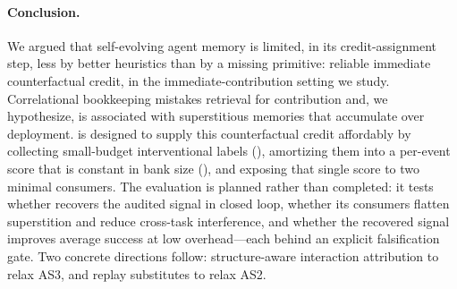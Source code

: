 \paragraph{Conclusion.}
We argued that self-evolving agent memory is limited, in its credit-assignment
step, less by better heuristics than by a missing primitive: reliable immediate
counterfactual credit, in the immediate-contribution setting we study.
Correlational bookkeeping mistakes retrieval for contribution and, we hypothesize,
is associated with superstitious memories that accumulate over deployment.
\method{} is designed to supply this counterfactual credit
affordably by collecting small-budget interventional labels (\rit{}), amortizing
them into a per-event score that is constant in bank size (\aca{}), and exposing
that single score to two
minimal consumers. The evaluation is planned rather than completed: it tests
whether \aca{} recovers the audited signal in closed loop, whether its consumers
flatten superstition and reduce cross-task interference, and whether the recovered
signal improves average success at low overhead---each behind an explicit
falsification gate. Two concrete directions follow: structure-aware interaction
attribution to relax AS3, and replay substitutes to relax AS2.
